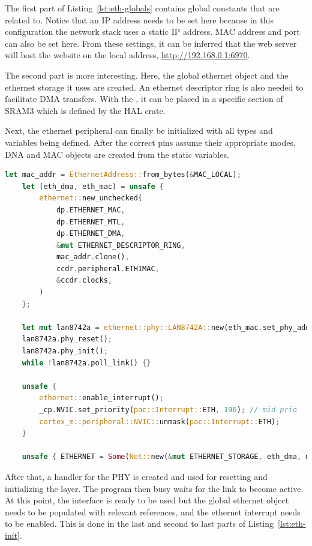 The first part of Listing~\ref{lst:eth-globals} contains global constants that are related to. Notice that an IP address needs to be set here because in this configuration the network stack uses a static IP address. MAC address and port can also be set here. From these settings, it can be inferred that the web server will host the website on the local address, \url{http://192.168.0.1:6970}.

The second part is more interesting. Here, the global ethernet object and the ethernet storage it uses are created. An ethernet descriptor ring is also needed to facilitate DMA transfers. With the \mycode{#[link_section = ".sram3.eth]}, it can be placed in a specific section of SRAM3 which is defined by the HAL crate.

Next, the ethernet peripheral can finally be initialized with all types and variables being defined. After the correct pins assume their appropriate modes, DNA and MAC objects are created from the static variables.

\begin{lstlisting}[language=Rust,frame=single,float=!ht,style=customrust,label={lst:eth-init},caption={Initialization of the Ethernet Peripheral}]
    let mac_addr = EthernetAddress::from_bytes(&MAC_LOCAL);
    let (eth_dma, eth_mac) = unsafe {
        ethernet::new_unchecked(
            dp.ETHERNET_MAC,
            dp.ETHERNET_MTL,
            dp.ETHERNET_DMA,
            &mut ETHERNET_DESCRIPTOR_RING,
            mac_addr.clone(),
            ccdr.peripheral.ETH1MAC,
            &ccdr.clocks,
        )
    };

    let mut lan8742a = ethernet::phy::LAN8742A::new(eth_mac.set_phy_addr(0));
    lan8742a.phy_reset();
    lan8742a.phy_init();
    while !lan8742a.poll_link() {}

    unsafe {
        ethernet::enable_interrupt();
        _cp.NVIC.set_priority(pac::Interrupt::ETH, 196); // mid prio
        cortex_m::peripheral::NVIC::unmask(pac::Interrupt::ETH);
    }

    unsafe { ETHERNET = Some(Net::new(&mut ETHERNET_STORAGE, eth_dma, mac_addr)); }
\end{lstlisting}

After that, a handler for the PHY is created and used for resetting and initializing the layer. The program then busy waits for the link to become active. At this point, the interface is ready to be used but the global ethernet object needs to be populated with relevant references, and the ethernet interrupt needs to be enabled. This is done in the last and second to last parts of Listing~\ref{lst:eth-init}.

